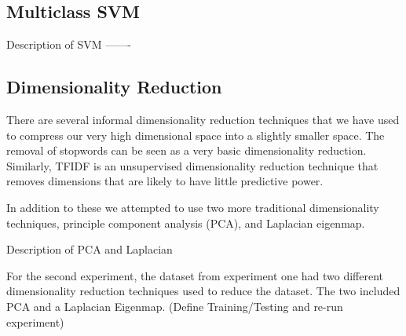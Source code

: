 
\subsection{Multiclass SVM} %
\label{sub:multiclass_svm}





Description of SVM -------



\subsection{Dimensionality Reduction}
There are several informal dimensionality reduction techniques that we have used to compress our very high dimensional space into a slightly smaller space. The removal of stopwords can be seen as a very basic dimensionality reduction. Similarly, TFIDF is an unsupervised dimensionality reduction technique that removes dimensions that are likely to have little predictive power.

In addition to these we attempted to use two more traditional dimensionality techniques, principle component analysis (PCA), and Laplacian eigenmap. 


Description of PCA and Laplacian


For the second experiment, the dataset from experiment one had two different dimensionality reduction techniques used to reduce the dataset.  The two included PCA and a Laplacian Eigenmap.  (Define Training/Testing and re-run experiment)

